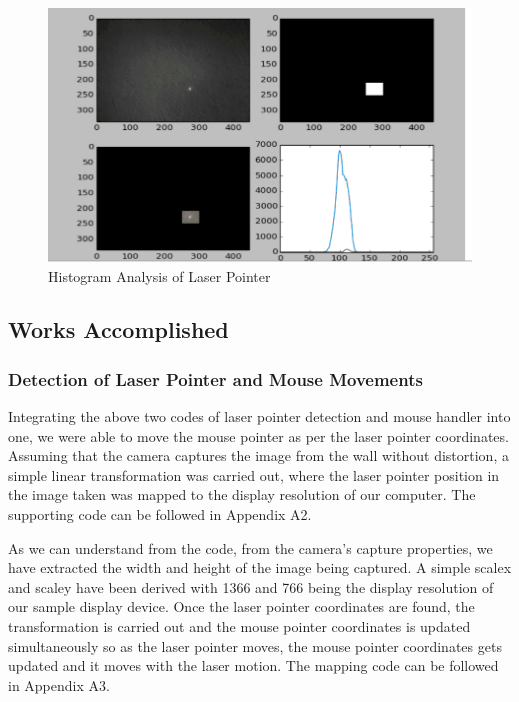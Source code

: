 \documentclass[12pt, a4paper]{article}
\begin{document}
\begin{figure}[htp]
	\centering
	\includegraphics[scale=0.35]{histogram.png}
	\caption{Histogram Analysis of Laser Pointer}
	\label{}
\end{figure}


\newpage
\subsection{Works Accomplished}
\subsubsection{Detection of Laser Pointer and Mouse Movements}
	Integrating the above two codes of laser pointer detection and mouse handler into one, we were able to move the mouse pointer as per the laser pointer coordinates. Assuming that the camera captures the image from the wall without distortion, a simple linear transformation was carried out, where the laser pointer position in the image taken was mapped to the display resolution of our computer. The supporting code can be followed in Appendix A2.

	As we can understand from the code, from the camera's capture properties, we have extracted the width and height of the image being captured. A simple scalex and scaley have been derived with 1366 and 766 being the display resolution of our sample display device. Once the laser pointer coordinates are found, the transformation is carried out and the mouse pointer coordinates is updated simultaneously so as the laser pointer moves, the mouse pointer coordinates gets updated and it moves with the laser motion. The mapping code can be followed in Appendix A3.
\end{document}

